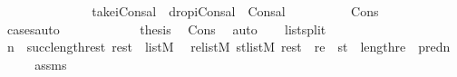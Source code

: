 \begin{isabellebody}
\ \ \ \ \ \ \isamarkupfalse%
\isanewline
\ \ \ \ \ \ \isamarkupfalse%
\ {\isachardoublequoteopen}take{\isacharparenleft}{\kern0pt}i{\isacharcomma}{\kern0pt}Cons{\isacharparenleft}{\kern0pt}a{\isacharcomma}{\kern0pt}l{\isacharparenright}{\kern0pt}{\isacharparenright}{\kern0pt}\ {\isacharat}{\kern0pt}\ drop{\isacharparenleft}{\kern0pt}i{\isacharcomma}{\kern0pt}Cons{\isacharparenleft}{\kern0pt}a{\isacharcomma}{\kern0pt}l{\isacharparenright}{\kern0pt}{\isacharparenright}{\kern0pt}\ {\isacharequal}{\kern0pt}\ Cons{\isacharparenleft}{\kern0pt}a{\isacharcomma}{\kern0pt}l{\isacharparenright}{\kern0pt}{\isachardoublequoteclose}\isanewline
\ \ \ \ \ \ \ \ \isamarkupfalse%
\ Cons\isanewline
\ \ \ \ \ \ \ \ \isamarkupfalse%
\ {\isacharparenleft}{\kern0pt}cases{\isacharsemicolon}{\kern0pt}auto{\isacharparenright}{\kern0pt}\isanewline
\ \ \ \ \isacommand{{\isacharbraceright}{\kern0pt}}\isamarkupfalse%
\isanewline
\ \ \ \ \isamarkupfalse%
\ \isamarkupfalse%
\ {\isacharquery}{\kern0pt}thesis\ \isamarkupfalse%
\ Cons\ \isamarkupfalse%
\ auto\isanewline
\ \ \isamarkupfalse%
\isanewline
{}\isamarkupfalse%
%
\endisatagproof
{\isafoldproof}%
%
\isadelimproof
\isanewline
%
\endisadelimproof
\isanewline
{}\isamarkupfalse%
\ list{\isacharunderscore}{\kern0pt}split\ {\isacharcolon}{\kern0pt}\isanewline
{}\ {\isachardoublequoteopen}n\ {\isasymle}\ succ{\isacharparenleft}{\kern0pt}length{\isacharparenleft}{\kern0pt}rest{\isacharparenright}{\kern0pt}{\isacharparenright}{\kern0pt}{\isachardoublequoteclose}\ {\isachardoublequoteopen}rest\ {\isasymin}\ list{\isacharparenleft}{\kern0pt}M{\isacharparenright}{\kern0pt}{\isachardoublequoteclose}\isanewline
{}\ \ {\isachardoublequoteopen}{\isasymexists}re{\isasymin}list{\isacharparenleft}{\kern0pt}M{\isacharparenright}{\kern0pt}{\isachardot}{\kern0pt}\ {\isasymexists}st{\isasymin}list{\isacharparenleft}{\kern0pt}M{\isacharparenright}{\kern0pt}{\isachardot}{\kern0pt}\ rest\ {\isacharequal}{\kern0pt}\ re\ {\isacharat}{\kern0pt}\ st\ {\isasymand}\ length{\isacharparenleft}{\kern0pt}re{\isacharparenright}{\kern0pt}\ {\isacharequal}{\kern0pt}\ pred{\isacharparenleft}{\kern0pt}n{\isacharparenright}{\kern0pt}{\isachardoublequoteclose}\isanewline
%
\isadelimproof
%
\endisadelimproof
%
\isatagproof
{}\isamarkupfalse%
\ {\isacharminus}{\kern0pt}\isanewline
\ \ \isamarkupfalse%
\ assms\isanewline
\ \ \isamarkupfalse%

\end{isabellebody}
